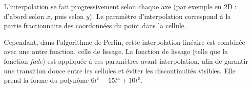 L’interpolation se fait progressivement selon chaque axe (par exemple en 2D : d’abord selon $x$, puis selon $y$).
Le paramètre d’interpolation correspond à la partie fractionnaire des coordonnées du point dans la cellule.

Cependant, dans l’algorithme de Perlin, cette interpolation linéaire est combinée avec une autre fonction, celle de lissage.
La fonction de lissage (telle que la fonction \textit{fade}) est appliquée à ces paramètres avant interpolation, afin de garantir une transition douce entre les cellules et éviter les discontinuités visibles.
Elle prend la forme du polynôme $6 t^5 - 15 t^4 + 10 t^3$.
